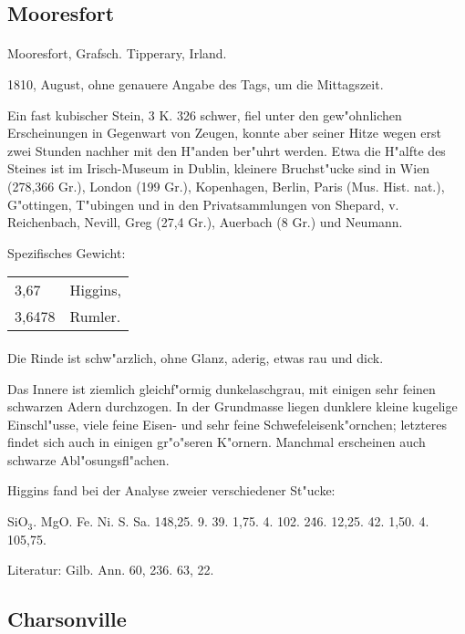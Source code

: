\documentclass[a4paper, 11pt, oneside]{article}
\begin{document}
\subsection{Mooresfort}
\normalsize
\paragraph{}
Mooresfort, Grafsch. Tipperary, Irland.

1810, August, ohne genauere Angabe des Tags, um die Mittagszeit.

Ein fast kubischer Stein, 3 K. 326 schwer, fiel unter den gew"ohnlichen Erscheinungen in Gegenwart von Zeugen, konnte aber seiner Hitze wegen erst zwei Stunden nachher mit den H"anden ber"uhrt werden. Etwa die H"alfte des Steines ist im Irisch-Museum in Dublin, kleinere Bruchst"ucke sind in Wien (278,366 Gr.), London (199 Gr.), Kopenhagen, Berlin, Paris (Mus. Hist. nat.), G"ottingen, T"ubingen und in den Privatsammlungen von Shepard, v. Reichenbach, Nevill, Greg (27,4 Gr.), Auerbach (8 Gr.) und Neumann.

Spezifisches Gewicht:
\begin{table}[!ht]
    \centering
    \begin{tabular}{l l}
        3,67 & Higgins,\\
        3,6478 & Rumler.
    \end{tabular}
\end{table}
\paragraph{}
Die Rinde ist schw"arzlich, ohne Glanz, aderig, etwas rau und dick.

Das Innere ist ziemlich gleichf"ormig dunkelaschgrau, mit einigen sehr feinen schwarzen Adern durchzogen. In der Grundmasse liegen dunklere kleine kugelige Einschl"usse, viele feine Eisen- und sehr feine Schwefeleisenk"ornchen; letzteres findet sich auch in einigen gr"o"seren K"ornern. Manchmal erscheinen auch schwarze Abl"osungsfl"achen.

Higgins fand bei der Analyse zweier verschiedener St"ucke:

SiO$_{3}$. MgO. Fe. Ni. S. Sa.  
1\. 48,25. 9. 39. 1,75. 4. 102.  
2\. 46. 12,25. 42. 1,50. 4. 105,75.

Literatur: Gilb. Ann. 60, 236. 63, 22.

\subsection{Charsonville}
\normalsize
\end{document}
